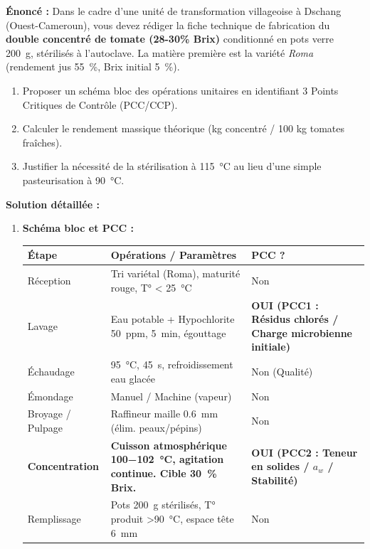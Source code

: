 \documentclass[11pt]{article}
\begin{document}
\begin{exoresolu}
    \textbf{Énoncé :} Dans le cadre d'une unité de transformation villageoise à Dschang (Ouest-Cameroun), vous devez rédiger la fiche technique de fabrication du \textbf{double concentré de tomate (28-30\% Brix)} conditionné en pots verre \SI{200}{g}, stérilisés à l'autoclave. La matière première est la variété \emph{Roma} (rendement jus \SI{55}{\%}, Brix initial \SI{5}{\%}).
    \begin{enumerate}
        \item Proposer un schéma bloc des opérations unitaires en identifiant 3 Points Critiques de Contrôle (PCC/CCP).
        \item Calculer le rendement massique théorique (kg concentré / 100 kg tomates fraîches).
        \item Justifier la nécessité de la stérilisation à \SI{115}{\celsius} au lieu d'une simple pasteurisation à \SI{90}{\celsius}.
    \end{enumerate}
    \tcblower
    \textbf{Solution détaillée :}
    \begin{enumerate}
        \item \textbf{Schéma bloc et PCC :}
            \begin{center}
                \begin{tabular}{|l|l|l|}\hline
                \textbf{Étape} & \textbf{Opérations / Paramètres} & \textbf{PCC ?} \\ \hline
                Réception & Tri variétal (Roma), maturité rouge, T° < \SI{25}{\celsius} & Non \\ \hline
                Lavage & Eau potable + Hypochlorite \SI{50}{ppm}, \SI{5}{min}, égouttage & \textbf{OUI (PCC1 : Résidus chlorés / Charge microbienne initiale)} \\ \hline
                Échaudage & \SI{95}{\celsius}, \SI{45}{s}, refroidissement eau glacée & Non (Qualité) \\ \hline
                Émondage & Manuel / Machine (vapeur) & Non \\ \hline
                Broyage / Pulpage & Raffineur maille \SI{0,6}{mm} (élim. peaux/pépins) & Non \\ \hline
                \textbf{Concentration} & \textbf{Cuisson atmosphérique \SI{100-102}{\celsius}, agitation continue. Cible \textbf{\SI{30}{\%} Brix}.} & \textbf{OUI (PCC2 : Teneur en solides / $a_w$ / Stabilité)} \\ \hline
                Remplissage & Pots \SI{200}{g} stérilisés, T° produit \SI{>90}{\celsius}, espace tête \SI{6}{mm} & Non \\ \hline

\end{tabular}
\end{center}
\end{enumerate}
\end{exoresolu}
\end{document}
